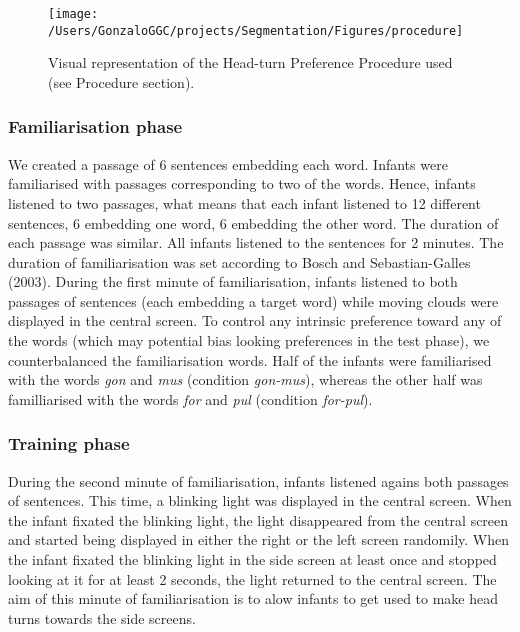 \documentclass[man,floatsintext]{apa6}
\begin{document}
\begin{figure}
\texttt{[image: /Users/GonzaloGGC/projects/Segmentation/Figures/procedure]} \caption{Visual representation of the Head-turn Preference Procedure used (see Procedure section).}\label{fig:procedure}
\end{figure}

\hypertarget{familiarisation-phase}{%
\subsubsection{Familiarisation phase}\label{familiarisation-phase}}

We created a passage of 6 sentences embedding each word. Infants were familiarised with passages corresponding to two of the words. Hence, infants listened to two passages, what means that each infant listened to 12 different sentences, 6 embedding one word, 6 embedding the other word. The duration of each passage was similar. All infants listened to the sentences for 2 minutes. The duration of familiarisation was set according to Bosch and Sebastian-Galles (2003). During the first minute of familiarisation, infants listened to both passages of sentences (each embedding a target word) while moving clouds were displayed in the central screen. To control any intrinsic preference toward any of the words (which may potential bias looking preferences in the test phase), we counterbalanced the familiarisation words. Half of the infants were familiarised with the words \emph{gon} and \emph{mus} (condition \emph{gon-mus}), whereas the other half was familliarised with the words \emph{for} and \emph{pul} (condition \emph{for-pul}).

\hypertarget{training-phase}{%
\subsubsection{Training phase}\label{training-phase}}

During the second minute of familiarisation, infants listened agains both passages of sentences. This time, a blinking light was displayed in the central screen. When the infant fixated the blinking light, the light disappeared from the central screen and started being displayed in either the right or the left screen randomily. When the infant fixated the blinking light in the side screen at least once and stopped looking at it for at least 2 seconds, the light returned to the central screen. The aim of this minute of familiarisation is to alow infants to get used to make head turns towards the side screens.
\end{document}
